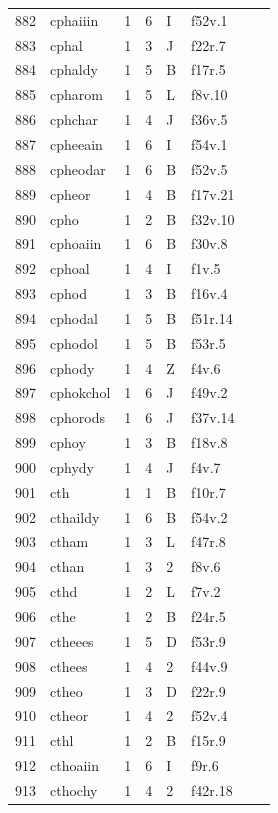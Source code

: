 \documentclass[11pt,a4paper]{article}
\begin{document}
\begin{landscape}
\begin{longtable}{@{}r>{\ttfamily}lrrl>{\ttfamily}l>{\raggedright\arraybackslash}p{80mm}>{\raggedright\arraybackslash}p{36mm}@{}}
882 & cphaiiin & 1 & 6 & I & f52v.1 &  & \\
883 & cphal & 1 & 3 & J & f22r.7 &  & \\
884 & cphaldy & 1 & 5 & B & f17r.5 &  & \\
885 & cpharom & 1 & 5 & L & f8v.10 &  & \\
886 & cphchar & 1 & 4 & J & f36v.5 &  & \\
887 & cpheeain & 1 & 6 & I & f54v.1 &  & \\
888 & cpheodar & 1 & 6 & B & f52v.5 &  & \\
889 & cpheor & 1 & 4 & B & f17v.21 &  & \\
890 & cpho & 1 & 2 & B & f32v.10 &  & \\
891 & cphoaiin & 1 & 6 & B & f30v.8 &  & \\
892 & cphoal & 1 & 4 & I & f1v.5 &  & \\
893 & cphod & 1 & 3 & B & f16v.4 &  & \\
894 & cphodal & 1 & 5 & B & f51r.14 &  & \\
895 & cphodol & 1 & 5 & B & f53r.5 &  & \\
896 & cphody & 1 & 4 & Z & f4v.6 &  & \\
897 & cphokchol & 1 & 6 & J & f49v.2 &  & \\
898 & cphorods & 1 & 6 & J & f37v.14 &  & \\
899 & cphoy & 1 & 3 & B & f18v.8 &  & \\
900 & cphydy & 1 & 4 & J & f4v.7 &  & \\
901 & cth & 1 & 1 & B & f10r.7 &  & \\
902 & cthaildy & 1 & 6 & B & f54v.2 &  & \\
903 & ctham & 1 & 3 & L & f47r.8 &  & \\
904 & cthan & 1 & 3 & 2 & f8v.6 &  & \\
905 & cthd & 1 & 2 & L & f7v.2 &  & \\
906 & cthe & 1 & 2 & B & f24r.5 &  & \\
907 & ctheees & 1 & 5 & D & f53r.9 &  & \\
908 & cthees & 1 & 4 & 2 & f44v.9 &  & \\
909 & ctheo & 1 & 3 & D & f22r.9 &  & \\
910 & ctheor & 1 & 4 & 2 & f52v.4 &  & \\
911 & cthl & 1 & 2 & B & f15r.9 &  & \\
912 & cthoaiin & 1 & 6 & I & f9r.6 &  & \\
913 & cthochy & 1 & 4 & 2 & f42r.18 &  & \\

\end{longtable}
\end{landscape}
\end{document}
